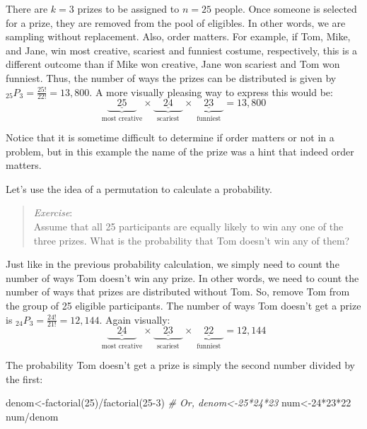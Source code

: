 \documentclass[
]{book}
\newenvironment{Shaded}{\begin{snugshade}}{\end{snugshade}}
\newcommand{\CommentTok}[1]{\textcolor[rgb]{0.56,0.35,0.01}{\textit{#1}}}
\newcommand{\DecValTok}[1]{\textcolor[rgb]{0.00,0.00,0.81}{#1}}
\newcommand{\FunctionTok}[1]{\textcolor[rgb]{0.00,0.00,0.00}{#1}}
\newcommand{\NormalTok}[1]{#1}
\newcommand{\OtherTok}[1]{\textcolor[rgb]{0.56,0.35,0.01}{#1}}
\newcommand{\SpecialCharTok}[1]{\textcolor[rgb]{0.00,0.00,0.00}{#1}}
\begin{document}
There are \(k=3\) prizes to be assigned to \(n=25\) people. Once someone is selected for a prize, they are removed from the pool of eligibles. In other words, we are sampling without replacement. Also, order matters. For example, if Tom, Mike, and Jane, win most creative, scariest and funniest costume, respectively, this is a different outcome than if Mike won creative, Jane won scariest and Tom won funniest. Thus, the number of ways the prizes can be distributed is given by \({}_{25}P_3 = \frac{25!}{22!} = 13,800\). A more visually pleasing way to express this would be:
\[
\underbrace{\underline{\quad 25 \quad }}_\text{most creative} \times \underbrace{\underline{\quad 24 \quad }}_\text{scariest} \times \underbrace{\underline{\quad 23 \quad }}_\text{funniest} = 13,800
\]

Notice that it is sometime difficult to determine if order matters or not in a problem, but in this example the name of the prize was a hint that indeed order matters.

Let's use the idea of a permutation to calculate a probability.

\begin{quote}
\emph{Exercise}:\\
Assume that all 25 participants are equally likely to win any one of the three prizes. What is the probability that Tom doesn't win any of them?
\end{quote}

Just like in the previous probability calculation, we simply need to count the number of ways Tom doesn't win any prize. In other words, we need to count the number of ways that prizes are distributed without Tom. So, remove Tom from the group of 25 eligible participants. The number of ways Tom doesn't get a prize is \({}_{24}P_3 = \frac{24!}{21!}=12,144\). Again visually:
\[
\underbrace{\underline{\quad 24 \quad }}_\text{most creative} \times \underbrace{\underline{\quad 23 \quad }}_\text{scariest} \times \underbrace{\underline{\quad 22 \quad }}_\text{funniest} = 12,144
\]

The probability Tom doesn't get a prize is simply the second number divided by the first:

\begin{Shaded}
\begin{Highlighting}[]
\NormalTok{denom}\OtherTok{\textless{}{-}}\FunctionTok{factorial}\NormalTok{(}\DecValTok{25}\NormalTok{)}\SpecialCharTok{/}\FunctionTok{factorial}\NormalTok{(}\DecValTok{25{-}3}\NormalTok{)}
\CommentTok{\# Or, denom\textless{}{-}25*24*23}
\NormalTok{num}\OtherTok{\textless{}{-}}\DecValTok{24}\SpecialCharTok{*}\DecValTok{23}\SpecialCharTok{*}\DecValTok{22}
\NormalTok{num}\SpecialCharTok{/}\NormalTok{denom}
\end{Highlighting}
\end{Shaded}
\end{document}
